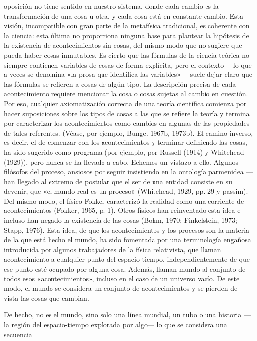\begin{justifying}
\begin{justifying}
oposición no tiene sentido en nuestro sistema, donde cada cambio es la
transformación de una cosa u otra, y cada cosa está en constante cambio. Esta
visión, incompatible con gran parte de la metafísica tradicional, es coherente
con la ciencia: esta última no proporciona ninguna base para plantear la hipótesis de la
existencia de acontecimientos sin cosas, del mismo modo que no sugiere que pueda
haber cosas inmutables. Es cierto que las fórmulas de la ciencia teórica no
siempre contienen variables de cosas de forma explícita, pero el contexto —lo que
a veces se denomina «la prosa que identifica las variables»— suele
dejar claro que las fórmulas se refieren a cosas de algún tipo.
La descripción precisa de cada acontecimiento requiere mencionar la cosa o
cosas sujetas al cambio en cuestión. Por eso, cualquier axiomatización correcta
de una teoría científica comienza por hacer suposiciones
sobre los tipos de cosas a las que se refiere la teoría y termina por
caracterizar los acontecimientos como cambios en algunas de las propiedades de tales
referentes. (Véase, por ejemplo, Bunge, 1967b, 1973b). El camino inverso, es decir,
el de comenzar con los acontecimientos y terminar definiendo las cosas, ha sido
sugerido como programa (por ejemplo, por Russell (1914) y Whitehead (1929)),
pero nunca se ha llevado a cabo. Echemos un vistazo a ello.
Algunos filósofos del proceso, ansiosos por seguir insistiendo en la
ontología parmenidea —han llegado al extremo de postular que el
ser de una entidad consiste en su devenir, que «el mundo real es un
proceso» (Whitehead, 1929, pp. 29 y passim). Del mismo modo, el físico
Fokker caracterizó la realidad como una corriente de acontecimientos (Fokker, 1965, p. 1).
Otros físicos han reinventado esta idea e incluso han negado la
existencia de las cosas (Bohm, 1970; Finkelstein, 1973; Stapp, 1976). Esta
idea, de que los acontecimientos y los procesos son la materia de la que está hecho el mundo, ha
sido fomentada por una terminología engañosa introducida por algunos
trabajadores de la física relativista, que llaman acontecimiento a cualquier punto del espacio-tiempo,
independientemente de que ese punto esté ocupado por alguna cosa. Además,
llaman mundo al conjunto de todos esos «acontecimientos», incluso en el caso de un universo vacío.
De este modo, el mundo se considera un conjunto de acontecimientos y se pierden de vista las cosas que
cambian.

De hecho, no es el mundo, sino solo una línea mundial, un tubo o una historia
—la región del espacio-tiempo explorada por algo— lo que se considera una secuencia


\end{justifying}
\end{justifying}
